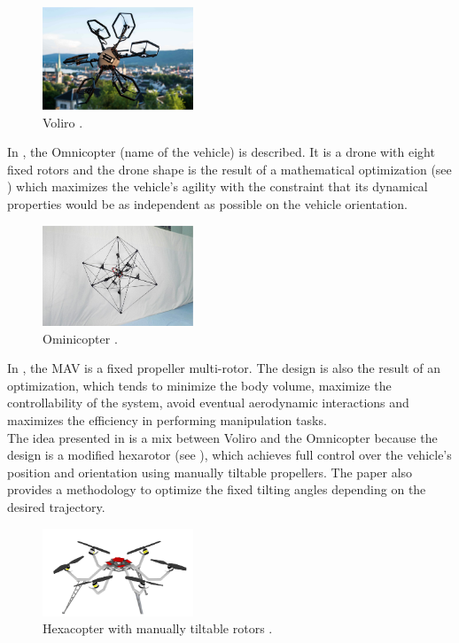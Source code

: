 \begin{figure}[h]
\centering
\includegraphics[width=0.4\textwidth]{images/voliro.png}
\caption{Voliro \citep{kamel_voliro:_2018}.}
\label{fig:voliro}
\end{figure}

In \citep{brescianini_design_2016}, the Omnicopter (name of the vehicle) is described.
It is a drone with eight fixed rotors and the drone shape is the result of a mathematical
optimization (see ) which maximizes the vehicle’s agility with
the constraint that its dynamical properties would be as independent as possible
on the vehicle orientation.

\begin{figure}[h]
\centering
\includegraphics[width=0.4\textwidth]{images/idsc.jpg}
\caption{Ominicopter \citep{brescianini_design_2016}.}
\label{fig:omnicopter}
\end{figure}

In \citep{nikou_mechanical_2015}, the MAV is a fixed propeller multi-rotor.
The design is also the result of an optimization, which tends to minimize the
body volume, maximize the controllability of the system, avoid eventual
aerodynamic interactions and maximizes the efficiency in performing
manipulation tasks. \\
The idea presented in \citep{rajappa_modeling_2015} is a mix between
Voliro and the Omnicopter because the design is a modified hexarotor (see ),
which achieves full control over the vehicle’s position and orientation using
manually tiltable propellers. The paper also provides a methodology to
optimize the fixed tilting angles depending on the desired trajectory.

\begin{figure}[h]
  \centering
  \includegraphics[width=0.4\textwidth]{images/hexacopter.png}
  \caption{Hexacopter with manually tiltable rotors \citep{rajappa_modeling_2015}.}
  \label{fig:hexacopter}
\end{figure}

